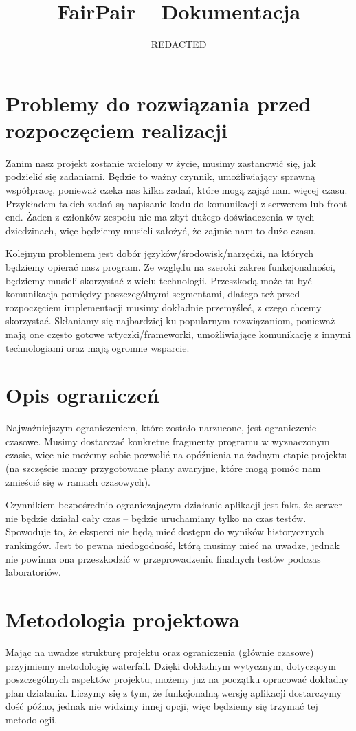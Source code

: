 \documentclass{article}
\title{FairPair -- Dokumentacja}
\author{REDACTED}
\begin{document}
\maketitle

\section{Problemy do rozwiązania przed rozpoczęciem realizacji}

Zanim nasz projekt zostanie wcielony w życie, musimy zastanowić się, jak
podzielić się zadaniami.  Będzie to ważny czynnik, umożliwiający sprawną
współpracę, ponieważ czeka nas kilka zadań, które mogą zająć nam więcej czasu.
Przykładem takich zadań są napisanie kodu do komunikacji z serwerem lub
front end. Żaden z członków zespołu nie ma zbyt dużego doświadczenia w tych
dziedzinach, więc będziemy musieli założyć, że zajmie nam to dużo czasu.

Kolejnym problemem jest dobór języków/środowisk/narzędzi, na których będziemy
opierać nasz program. Ze względu na szeroki zakres funkcjonalności, będziemy
musieli skorzystać z wielu technologii.  Przeszkodą może tu być komunikacja
pomiędzy poszczególnymi segmentami, dlatego też przed rozpoczęciem implementacji
musimy dokładnie przemyśleć, z czego chcemy skorzystać. Skłaniamy się
najbardziej ku popularnym rozwiązaniom, ponieważ mają one często gotowe
wtyczki/frameworki, umożliwiające komunikację z innymi technologiami oraz mają
ogromne wsparcie.

\section{Opis ograniczeń}
Najważniejszym ograniczeniem, które zostało narzucone, jest
ograniczenie czasowe. Musimy dostarczać konkretne fragmenty programu w
wyznaczonym czasie, więc nie możemy sobie pozwolić na opóźnienia na
żadnym etapie projektu (na szczęście mamy przygotowane plany awaryjne,
które mogą pomóc nam zmieścić się w ramach czasowych).

Czynnikiem bezpośrednio ograniczającym działanie aplikacji jest fakt, że
serwer nie będzie działał cały czas -- będzie uruchamiany tylko na czas
testów. Spowoduje to, że eksperci nie będą mieć dostępu do wyników
historycznych rankingów. Jest to pewna niedogodność, którą musimy mieć
na uwadze, jednak nie powinna ona przeszkodzić w przeprowadzeniu
finalnych testów podczas laboratoriów.

\section{Metodologia projektowa}
Mając na uwadze strukturę projektu oraz ograniczenia (głównie
czasowe) przyjmiemy metodologię waterfall. Dzięki dokładnym wytycznym,
dotyczącym poszczególnych aspektów projektu, możemy już na początku
opracować dokładny plan działania. Liczymy się z tym, że funkcjonalną
wersję aplikacji dostarczymy dość późno, jednak nie widzimy innej opcji,
więc będziemy się trzymać tej metodologii.
\end{document}
